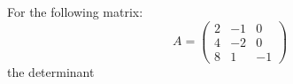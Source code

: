 \documentclass{ximera}
\author{Parisa Fatheddin}
\begin{document}
\begin{exercise}


For the following matrix:
\[
A = \begin{pmatrix} 
2 & -1 & 0 \\
4 & -2 & 0 \\
8 & 1 & -1
\end{pmatrix}
\]
the determinant 
\begin{multipleChoice}
\end{multipleChoice}




















\end{exercise}
\end{document}
